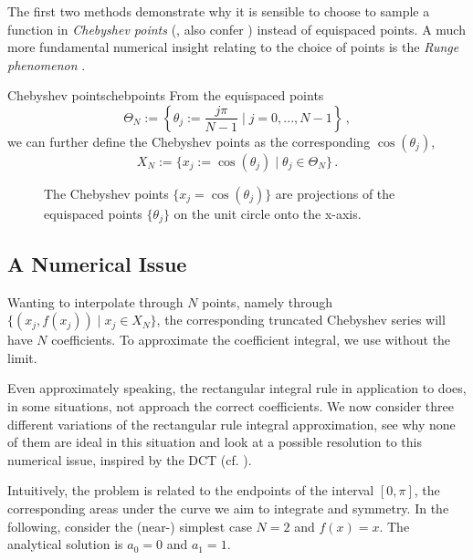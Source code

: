 \documentclass[12pt, a4paper]{article}
\newcommand{\chebyshev}{Chebyshev\xspace}
\begin{document}
  The first two methods demonstrate why it is sensible to choose to sample a function in \textit{\chebyshev points} (, also confer ) instead of equispaced points.
  A much more fundamental numerical insight relating to the choice of points is the \emph{Runge phenomenon} \parencite{runge-phenomenon}.

  \begin{definition}{Chebyshev points}{chebpoints}
    From the equispaced points
    $$\Theta_N := \left\{\theta_j := \frac{j\pi}{N-1} \;\bigg|\; j = 0, ..., N-1\right\} \,,$$
    we can further define the \chebyshev points as the corresponding $\cos(\theta_j)$,
    $$X_N := \{x_j := \cos(\theta_j) \;|\; \theta_j \in \Theta_N\} \,.$$
  \end{definition}

  \begin{figure}[H]
    \centering
    \caption{The \chebyshev points $\{x_j = \cos(\theta_j)\}$ are projections of the equispaced points $\{\theta_j\}$ on the unit circle onto the x-axis.}
    \label{fig:chebpoints}
  \end{figure}

  \subsection{A Numerical Issue}
  Wanting to interpolate through $N$ points, namely through $\{(x_j, f(x_j)) \;|\; x_j \in X_N\}$, the corresponding truncated \chebyshev series will have $N$ coefficients. To approximate the coefficient integral, we use  without the limit.

  Even approximately speaking, the rectangular integral rule in application to  does, in some situations, not approach the correct coefficients.
  We now consider three different variations of the rectangular rule integral approximation, see why none of them are ideal in this situation and look at a possible resolution to this numerical issue, inspired by the DCT (cf. ).

  Intuitively, the problem is related to the endpoints of the interval $[0, \pi]$, the corresponding areas under the curve we aim to integrate and symmetry.
  In the following, consider the (near-) simplest case $N = 2$ and $f(x) = x$.
  The analytical solution is $a_0 = 0$ and $a_1 = 1$.
\end{document}
